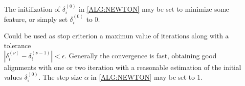 %
%
%


The initilization of $\delta_i ^{(0)}$  in \ref{ALG:NEWTON} may be set to minimize some feature, or
simply set $\delta_i ^{(0)}$ to $0$.

Could be used as stop criterion a maximun value of iterations along with a
tolerance \\ $| \delta_i ^{(\nu)} - \delta_i ^{(\nu-1)} | < \epsilon$.
Generally the convergence is fast, obtaining good alignments with one or two
iteration with a reasonable estimation of the initial values $\delta_i ^{(0)}$. The step size
$\alpha$ in \ref{ALG:NEWTON} may be set to $1$.
